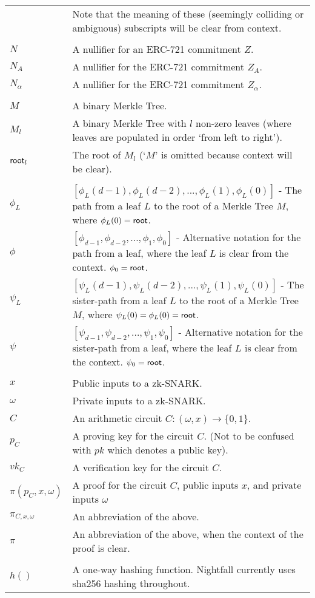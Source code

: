 \begin{center}
\begin{tabular}{lp{14cm}}
                & Note that the meaning of these (seemingly colliding or ambiguous) subscripts will be clear from context.\\
    \\
    $N$         & A nullifier for an ERC-721 commitment $Z$.\\
    $N_A$       & A nullifier for the ERC-721 commitment $Z_A$.\\
    $N_{\alpha}$ & A nullifier for the ERC-721 commitment $Z_{\alpha}$.\\
    \\
		$M$         & A binary Merkle Tree.\\
    $M_l$       & A binary Merkle Tree with $l$ non-zero leaves (where leaves are populated in order `from left to right').\\
    $\mathsf{root}_l$    & The root of $M_l$ (`$M$' is omitted because context will be clear).\\
    \\
    $\phi_{L}$  & $[\phi_{L}(d-1), \phi_{L}(d-2),..., \phi_{L}(1), \phi_{L}(0)]$ - The path from a leaf $L$ to the root of a Merkle Tree $M$, where $\phi_L(0) = \mathsf{root}$.\\
    $\phi$      & $[\phi_{d-1}, \phi_{d-2},..., \phi_{1}, \phi_0]$ - Alternative notation for the path from a leaf, where the leaf $L$ is clear from the context. $\phi_0 = \mathsf{root}$.\\
    $\psi_{L}$  & $[\psi_{L}(d-1), \psi_{L}(d-2),..., \psi_{L}(1), \psi_{L}(0)]$ - The sister-path from a leaf $L$ to the root of a Merkle Tree $M$, where $\psi_L(0) = \phi_L(0) = \mathsf{root}$.\\
    $\psi$      &  $[\psi_{d-1}, \psi_{d-2},..., \psi_{1}, \psi_0]$ - Alternative notation for the sister-path from a leaf, where the leaf $L$ is clear from the context. $\psi_0 = \mathsf{root}$.\\
    \\
		$x$         & Public inputs to a zk-SNARK. \\
		$\omega$    & Private inputs to a zk-SNARK.\\
		$C$         &  An arithmetic circuit $C: (\omega, x) \to \{0,1\}$.\\
		$p_C$       & A proving key for the circuit $C$. (Not to be confused with $pk$ which denotes a public key). \\
		$vk_C$      & A verification key for the circuit $C$. \\
    $\pi(p_C, x, \omega)$ & A proof for the circuit $C$, public inputs $x$, and private inputs $\omega$ \\
    $\pi_{C, x, \omega}$ & An abbreviation of the above. \\
    $\pi$       & An abbreviation of the above, when the context of the proof is clear. \\
    \\
    $h()$       & A one-way hashing function. Nightfall currently uses sha256 hashing throughout.\\
	\end{tabular}
\end{center}